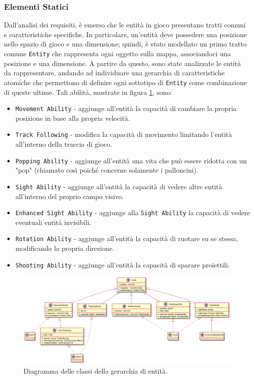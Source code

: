 \subsubsection{Elementi Statici}
Dall'analisi dei requisiti, è emerso che le entità in gioco presentano tratti comuni e caratteristiche specifiche. In
particolare, un'entità deve possedere una posizione nello spazio di gioco e una dimensione; quindi, è stato modellato
un primo tratto comune \texttt{Entity} che rappresenta ogni oggetto sulla mappa, associandoci una posizione e una
dimensione. A partire da questo, sono state analizzate le entità da rappresentare, andando ad individuare una gerarchia
di caratteristiche atomiche che permettono di definire ogni sottotipo di \texttt{Entity} come combinazione di queste
ultime. Tali abilità, mostrate in figura \ref{fig:class-entity-hierarchy-extended}, sono:
\begin{itemize}
    \item \texttt{Movement Ability} - aggiunge all'entità la capacità di cambiare la propria posizione in base alla
    propria velocità.
    \item \texttt{Track Following} - modifica la capacità di movimento limitando l'entità all'interno della traccia di
    gioco.
    \item \texttt{Popping Ability} - aggiunge all'entità una vita che può essere ridotta con un "pop" (chiamato così
    poiché concerne solamente i palloncini).
    \item \texttt{Sight Ability} - aggiunge all'entità la capacità di vedere altre entità all'interno del proprio campo
    visivo.
    \item \texttt{Enhanced Sight Ability} - aggiunge alla \texttt{Sight Ability} la capacità di vedere eventuali entità
    invisibili.
    \item \texttt{Rotation Ability} - aggiunge all'entità la capacità di ruotare su se stessa, modificando la propria
    direzione.
    \item \texttt{Shooting Ability} - aggiunge all'entità la capacità di sparare proiettili.
\end{itemize}

\begin{figure}[H]
    \centering
    \includegraphics[width=\linewidth]{img/class-entity-hierarchy-extended}
    \caption{Diagramma delle classi della gerarchia di entità.}
    \label{fig:class-entity-hierarchy-extended}
\end{figure}


